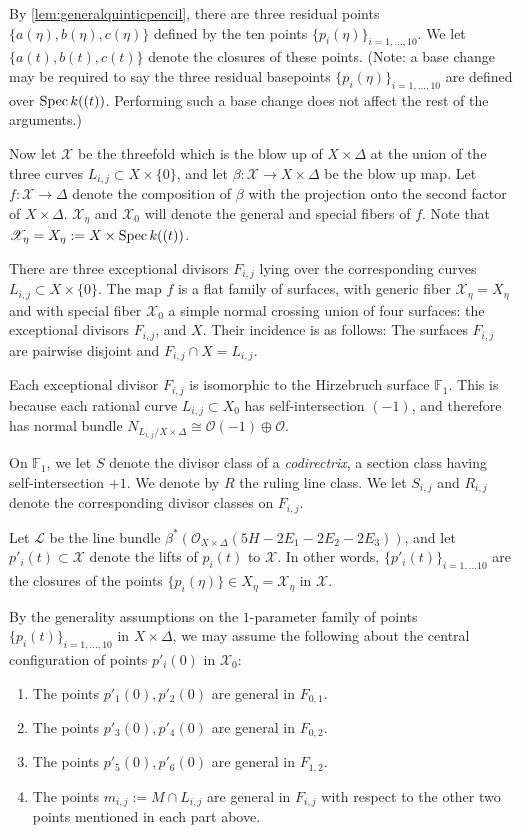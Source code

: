 \documentclass[reqno, 11pt]{amsart}
\theoremstyle{definition}
\theoremstyle{remark}
\numberwithin{equation}{section}
\numberwithin{thm}{section}
\numberwithin{prop}{section}
\numberwithin{lem}{section}
\numberwithin{cor}{section}
\numberwithin{conj}{section}
\numberwithin{defn}{section}
\newcommand{\F}{{\mathbb F}}
\renewcommand{\to}{\longrightarrow}
\newcommand {\from}{{\colon}}
\newcommand{\Spec}{{\text{\rm Spec}\,}}
\theoremstyle{plain}
\theoremstyle{definition}
\newcommand\so{{\mathscr O}}
\newcommand\scl{\mathscr L}
\newcommand\scx{\mathscr X}
\begin{document}
By \autoref{lem:generalquinticpencil}, there are three residual points $\{a(\eta), b(\eta), c(\eta)\}$ defined by the ten points $\{p_{i}(\eta)\}_{i=1, ... , 10}$. We let $\{a(t), b(t), c(t)\}$ denote the closures of these points.  (Note: a base change may be required to say the three residual basepoints $\{p_{i}(\eta)\}_{i=1, ... , 10}$ are defined over $\Spec k((t))$. Performing such a base change does not affect the rest of the arguments.) 





Now let $\scx$ be the threefold which is the blow up of $X \times \Delta$ at the union of the three curves $L_{i,j} \subset X \times \{0\}$, and let $\beta \from \scx \to X \times \Delta$ be the blow up map.  Let $f \from \scx \to \Delta$ denote the composition of $\beta$ with the projection onto the second factor of $X \times \Delta$.  $\scx_{\eta}$ and $\scx_{0}$ will denote the general and special fibers of $f$.  Note that $\scx_{\eta} = X_{\eta} := X \times \Spec k((t))$.


There are three exceptional divisors $F_{i,j}$ lying over the corresponding curves $L_{i,j} \subset X \times \{0\}$.  The map $f$ is a flat family of surfaces, with generic fiber $\scx_{\eta} = X_{\eta}$ and with special fiber $\scx_{0}$ a simple normal crossing union of four surfaces: 
the exceptional divisors $F_{i,j}$, and $X$.  Their incidence is as follows: The surfaces $F_{i,j}$ are pairwise disjoint and $F_{i,j} \cap X = L_{i,j}$.  

Each exceptional divisor $F_{i,j}$ is isomorphic to the Hirzebruch surface $\F_{1}$. This is because each rational curve $L_{i,j} \subset X_{0}$ has self-intersection $(-1)$, and therefore has normal bundle $N_{L_{i,j}/X \times \Delta} \cong \so(-1)\oplus \so.$

On $\F_{1}$, we let $S$ denote the divisor class of a {\sl codirectrix}, a section class having self-intersection $+1$.
	We denote by $R$ the ruling line class.  We let $S_{i,j}$ and $R_{i,j}$ denote the corresponding divisor classes on $F_{i,j}$.  

Let $\scl$ be the line bundle $\beta^{*}(\so_{X \times \Delta}(5H - 2E_{1}-2E_{2}-2E_{3}))$, and let $p'_{i}(t) \subset \scx$ denote the lifts of $p_{i}(t)$ to $\scx$. In other words, $\{p'_{i}(t) \}_{i=1, ... 10}$ are the closures of the points $\{p_{i}(\eta)\} \in X_{\eta} = \scx_{\eta}$ in $\scx$. 

By the generality assumptions on the $1$-parameter family of points $\{p_{i}(t)\}_{i=1, ... , 10}$ in $X \times \Delta$, we may assume the following about the central configuration of points $p'_{i}(0)$ in $\scx_{0}$:
\begin{enumerate}
\item The points $p'_{1}(0), p'_{2}(0)$ are general in $F_{0,1}$.
\item The points $p'_{3}(0), p'_{4}(0)$ are general in $F_{0,2}$.
\item The points $p'_{5}(0), p'_{6}(0)$ are general in $F_{1,2}$.
\item The points $m_{i,j} := M \cap L_{i,j}$ are general in $F_{i,j}$ with respect to the other two points mentioned in each part above. 
\end{enumerate}
\end{document}
